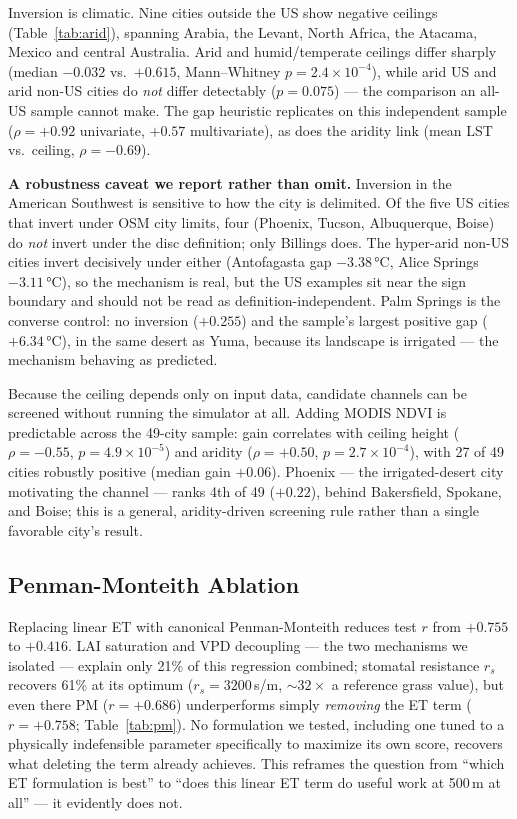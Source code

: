 \documentclass[conference]{IEEEtran}
\begin{document}
Inversion is climatic. Nine cities outside the US show negative ceilings
(Table~\ref{tab:arid}), spanning Arabia, the Levant, North Africa, the
Atacama, Mexico and central Australia. Arid and humid/temperate ceilings
differ sharply (median $-0.032$ vs.\ $+0.615$, Mann--Whitney
$p{=}2.4{\times}10^{-4}$), while arid US and arid non-US cities do
\emph{not} differ detectably ($p{=}0.075$) --- the comparison an all-US
sample cannot make. The gap heuristic replicates on this independent
sample ($\rho{=}{+}0.92$ univariate, $+0.57$ multivariate), as does the
aridity link (mean LST vs.\ ceiling, $\rho{=}{-}0.69$).

\textbf{A robustness caveat we report rather than omit.} Inversion in the
American Southwest is sensitive to how the city is delimited. Of the five
US cities that invert under OSM city limits, four (Phoenix, Tucson,
Albuquerque, Boise) do \emph{not} invert under the disc definition; only
Billings does. The hyper-arid non-US cities invert decisively under either
(Antofagasta gap $-3.38$\,°C, Alice Springs $-3.11$\,°C), so the
mechanism is real, but the US examples sit near the sign boundary and
should not be read as definition-independent. Palm Springs is the
converse control: no inversion ($+0.255$) and the sample's largest
positive gap ($+6.34$\,°C), in the same desert as Yuma, because its
landscape is irrigated --- the mechanism behaving as predicted.

Because the ceiling depends only on input data, candidate channels can be
screened without running the simulator at all. Adding MODIS NDVI is
predictable across the 49-city sample: gain correlates with ceiling
height ($\rho{=}{-}0.55$, $p{=}4.9\times10^{-5}$) and aridity
($\rho{=}{+}0.50$, $p{=}2.7\times10^{-4}$), with 27 of 49 cities robustly
positive (median gain $+0.06$). Phoenix — the irrigated-desert city
motivating the channel — ranks 4th of 49 ($+0.22$), behind Bakersfield,
Spokane, and Boise; this is a general, aridity-driven screening rule
rather than a single favorable city's result.

\subsection{Penman-Monteith Ablation}
Replacing linear ET with canonical Penman-Monteith reduces test $r$ from
$+0.755$ to $+0.416$. LAI saturation and VPD decoupling — the two
mechanisms we isolated — explain only 21\% of this regression combined;
stomatal resistance $r_s$ recovers 61\% at its optimum
($r_s{=}3200$\,s/m, $\sim32\times$ a reference grass value), but even
there PM ($r{=}{+}0.686$) underperforms simply \emph{removing} the ET
term ($r{=}{+}0.758$; Table~\ref{tab:pm}). No formulation we tested,
including one tuned to a physically indefensible parameter specifically
to maximize its own score, recovers what deleting the term already
achieves. This reframes the question from ``which ET formulation is
best'' to ``does this linear ET term do useful work at 500\,m at all'' —
it evidently does not.
\end{document}
